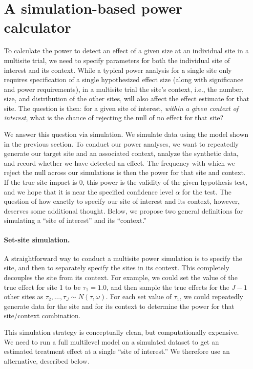 \documentclass[]{article}
\begin{document}
\section{A simulation-based power calculator}

To calculate the power to detect an effect of a given size at an individual site in a multisite trial, we need to specify parameters for both the individual site of interest and its context.
While a typical power analysis for a single site only requires specification of a single hypothesized effect size (along with significance and power requirements), in a multisite trial the site's context, i.e., the number, size, and distribution of the other sites, will also affect the effect estimate for that site.
The question is then: for a given site of interest, \textit{within a given context of interest}, what is the chance of rejecting the null of no effect for that site?

We answer this question via simulation.
We simulate data using the model shown in the previous section.
To conduct our power analyses, we want to repeatedly generate our target site and an associated context, analyze the synthetic data, and record whether we have detected an effect.
The frequency with which we reject the null across our simulations is then the power for that site and context.
If the true site impact is 0, this power is the validity of the given hypothesis test, and we hope that it is near the specified confidence level $\alpha$ for the test.
The question of how exactly to specify our site of interest and its context, however, deserves some additional thought.
Below, we propose two general definitions for simulating a ``site of interest'' and its ``context.''

\paragraph{Set-site simulation.} A straightforward way to conduct a multisite power simulation is to specify the site, and then to separately specify the sites in its context.
This completely decouples the site from its context.
For example, we could set the value of the true effect for site 1 to be $\tau_1 = 1.0$, and then sample the true effects for the $J-1$ other sites as $\tau_2, \dots, \tau_J \sim N(\tau, \omega)$.
For each set value of $\tau_1$, we could repeatedly generate data for the site and for its context to determine the power for that site/context combination.

This simulation strategy is conceptually clean, but computationally expensive.
We need to run a full multilevel model on a simulated dataset to get an estimated treatment effect at a single ``site of interest.''
We therefore use an alternative, described below.
\end{document}
